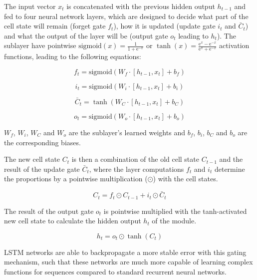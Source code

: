 The input vector $x_t$ is concatenated with the previous hidden output $h_{t-1}$ and fed to four neural network layers, which are designed to decide what part of the cell state will remain (forget gate $f_t$), how it is updated (update gate $i_t$ and 	$\bar{C}_t$) and what the output of the layer will be (output gate $o_t$ leading to $h_t$).
The sublayer have pointwise $\text{sigmoid}(x) = \frac{1}{1+\mathrm{e}^{-x}}$ or $\tanh(x) = \frac{\mathrm{e}^{x} - \mathrm{e}^{-x}}{\mathrm{e}^{x} + \mathrm{e}^{-x}}$ activation functions, leading to the following equations:

\begin{equation}\label{key}
	f_t = \text{sigmoid}(W_f \cdot [h_{t-1}, x_t] + b_f)
\end{equation}

\begin{equation}\label{key}
	i_t =  \text{sigmoid} (W_i \cdot [h_{t-1}, x_t] + b_i)
\end{equation}

\begin{equation}\label{key}
	\bar{C}_t = \tanh (W_C \cdot [h_{t-1}, x_t] + b_C)
\end{equation}

\begin{equation}\label{key}
	o_t =  \text{sigmoid} (W_o \cdot [h_{t-1}, x_t] + b_o)
\end{equation}

$W_f$, $W_i$, $W_C$ and $W_o$ are the sublayer's learned weights and $b_f$, $b_i$, $b_C$ and $b_o$ are the corresponding biases.

The new cell state $C_t$ is then a combination of the old cell state $C_{t-1}$ and the result of the update gate $\bar{C}_t$, where the layer computations $f_t$ and $i_t$ determine the proportions by a pointwise multiplication ($\odot$) with the cell states.

\begin{equation}\label{key}
	C_t = f_t \odot C_{t-1} + i_t \odot \bar{C}_t
\end{equation}

The result of the output gate $o_t$ is pointwise multiplied with the tanh-activated new cell state to calculate the hidden output $h_t$ of the module.

\begin{equation}\label{key}
	h_t = o_t \odot \tanh(C_t )
\end{equation}

LSTM networks are able to backpropagate a more stable error with this gating mechanism, such that these networks are much more capable of learning complex functions for sequences compared to standard recurrent neural networks.